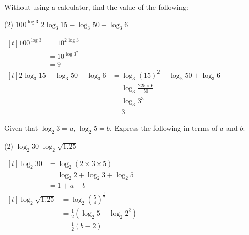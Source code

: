 \documentclass{report}
\begin{document}
        \newpage
        \begin{question}
            Without using a calculator, find the value of the following:
            \begin{tasks}[label=(\alph*)](2)
                \task $100^{\log 3}$
                \task $2 \log _3 15-\log _3 50+\log _3 6$
            \end{tasks}

            \sol{}
            \begin{tasks}[label=(\alph*)]
                \task $\begin{aligned}[t]
                    100^{\log 3} & =10^{2 \log 3} \\
                    & =10^{\log 3^2} \\
                    & =9
                \end{aligned}$
                \task $\begin{aligned}[t]
                    2 \log _3 15-\log _3 50+\log _3 6 & =\log _3(15)^2-\log _3 50+\log _3 6 \\
                    & =\log _3 \frac{225 \times 6}{50} \\
                    & =\log _3 3^3 \\
                    & =3
                \end{aligned}$
            \end{tasks}
        \end{question}

        \begin{question}
            Given that $\log_2 3 = a$, $\log_2 5 = b$. Express the following in terms of $a$ and $b$:
            \begin{tasks}[label=(\alph*)](2)
                \task $\log _2 30$
                \task $\log _2 \sqrt{1.25}$
            \end{tasks}

            \sol{}
            \begin{tasks}[label=(\alph*)]
                \task
                $
                \begin{aligned}[t]
                \log _2 30 & =\log _2(2 \times 3 \times 5) \\
                & =\log _2 2+\log _2 3+\log _2 5 \\
                & =1+a+b
                \end{aligned}
                $
                \task
                $
                \begin{aligned}[t]
                \log _2 \sqrt{1.25} & =\log _2\left(\frac{5}{4}\right)^{\frac{1}{2}} \\
                & =\frac{1}{2}\left(\log _2 5-\log _2 2^2\right) \\
                & =\frac{1}{2}(b-2)
                \end{aligned}
                $
            \end{tasks}
        \end{question}
\end{document}
